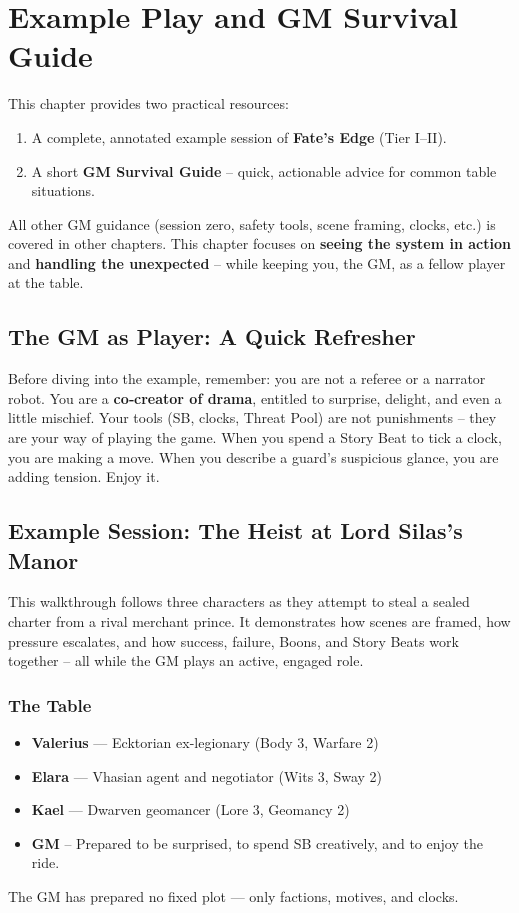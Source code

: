 \chapter{Example Play and GM Survival Guide}

This chapter provides two practical resources:
\begin{enumerate}
  \item A complete, annotated example session of \textbf{Fate’s Edge} (Tier I–II).
  \item A short \textbf{GM Survival Guide} – quick, actionable advice for common table situations.
\end{enumerate}
All other GM guidance (session zero, safety tools, scene framing, clocks, etc.) is covered in other chapters. This chapter focuses on \textbf{seeing the system in action} and \textbf{handling the unexpected} – while keeping you, the GM, as a fellow player at the table.

\section{The GM as Player: A Quick Refresher}

Before diving into the example, remember: you are not a referee or a narrator robot. You are a \textbf{co‑creator of drama}, entitled to surprise, delight, and even a little mischief. Your tools (SB, clocks, Threat Pool) are not punishments – they are your way of playing the game. When you spend a Story Beat to tick a clock, you are making a move. When you describe a guard’s suspicious glance, you are adding tension. Enjoy it.

\section{Example Session: The Heist at Lord Silas’s Manor}

This walkthrough follows three characters as they attempt to steal a sealed charter from a rival merchant prince. It demonstrates how scenes are framed, how pressure escalates, and how success, failure, Boons, and Story Beats work together – all while the GM plays an active, engaged role.

\subsection*{The Table}
\begin{itemize}
  \item \textbf{Valerius} — Ecktorian ex-legionary (Body 3, Warfare 2)
  \item \textbf{Elara} — Vhasian agent and negotiator (Wits 3, Sway 2)
  \item \textbf{Kael} — Dwarven geomancer (Lore 3, Geomancy 2)
  \item \textbf{GM} – Prepared to be surprised, to spend SB creatively, and to enjoy the ride.
\end{itemize}
The GM has prepared no fixed plot — only factions, motives, and clocks.

